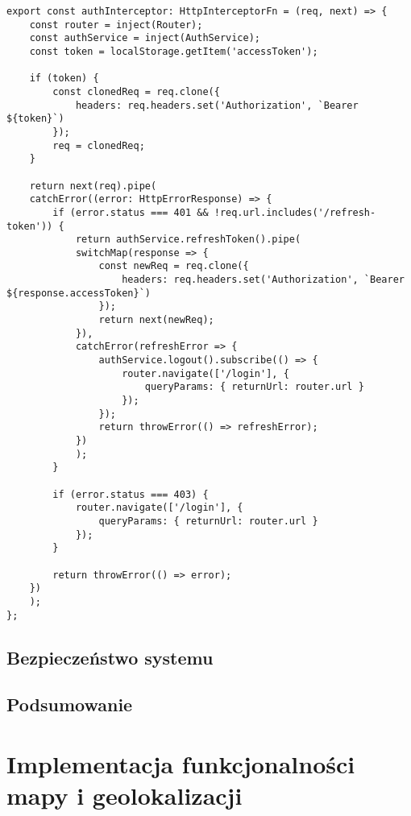 \begin{lstlisting}[style=tsstyle, caption={Interceptor HTTP}]
export const authInterceptor: HttpInterceptorFn = (req, next) => {
	const router = inject(Router);
	const authService = inject(AuthService);
	const token = localStorage.getItem('accessToken');
	
	if (token) {
		const clonedReq = req.clone({
			headers: req.headers.set('Authorization', `Bearer ${token}`)
		});
		req = clonedReq;
	}
	
	return next(req).pipe(
	catchError((error: HttpErrorResponse) => {
		if (error.status === 401 && !req.url.includes('/refresh-token')) {
			return authService.refreshToken().pipe(
			switchMap(response => {
				const newReq = req.clone({
					headers: req.headers.set('Authorization', `Bearer ${response.accessToken}`)
				});
				return next(newReq);
			}),
			catchError(refreshError => {
				authService.logout().subscribe(() => {
					router.navigate(['/login'], {
						queryParams: { returnUrl: router.url }
					});
				});
				return throwError(() => refreshError);
			})
			);
		}
		
		if (error.status === 403) {
			router.navigate(['/login'], { 
				queryParams: { returnUrl: router.url }
			});
		}
		
		return throwError(() => error);
	})
	);
};
\end{lstlisting}

\subsection{Bezpieczeństwo systemu}

\subsection{Podsumowanie}

\section{Implementacja funkcjonalności mapy i geolokalizacji}
